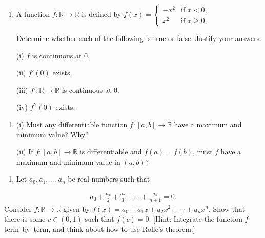 \documentclass[letterpaper,10pt,english]{jupyterBook}
\begin{document}
\label{\detokenize{Problems:id46}}\begin{enumerate}
%
\setcounter{enumi}{45}
\item {} 
\sphinxAtStartPar
A function \(f:\mathbb{R} \rightarrow \mathbb{R}\) is defined by \(f(x) = \begin{cases} -x^{2} & \text{if }x < 0,\\ x^{2} & \text{if }x \geq 0. \end{cases}\)

Determine whether each of the following is true or false. Justify your answers.

\sphinxAtStartPar
(i) \(f\) is continuous at \(0\).

\sphinxAtStartPar
(ii) \(f'(0)\) exists.

\sphinxAtStartPar
(iii) \(f':\mathbb{R}\to\mathbb{R}\) is continuous at \(0\).

\sphinxAtStartPar
(iv) \(f^{\prime \prime}(0)\) exists.

\end{enumerate}
\label{\detokenize{Problems:id47}}\begin{enumerate}
%
\setcounter{enumi}{46}
\item {} 
\sphinxAtStartPar
{}

\sphinxAtStartPar
(i) Must any differentiable function \(f:[a, b] \rightarrow \mathbb{R}\) have a maximum and minimum value? Why?

\sphinxAtStartPar
(ii) If \(f:[a, b] \rightarrow \mathbb{R}\) is differentiable  and \(f(a) = f(b)\), must \(f\) have a maximum and minimum value in \((a, b)\)?

\end{enumerate}
\label{\detokenize{Problems:id48}}\begin{enumerate}
%
\setcounter{enumi}{47}
\item {} 
\sphinxAtStartPar
Let \(a_{0}, a_{1}, \ldots, a_{n}\) be real numbers such that

\end{enumerate}
\begin{equation*}
\begin{split}
a_{0} + \frac{a_{1}}{2} + \frac{a_{2}}{3} + \cdots + \frac{a_{n}}{n+1} = 0.
\end{split}
\end{equation*}
\sphinxAtStartPar
Consider \(f:\mathbb{R}\to\mathbb{R}\) given by \(f(x) = a_{0}+ a_{1}x + a_{2}x^{2} + \cdots + a_{n}x^{n}\). Show that there is some \(c\in (0,1)\) such that \(f(c)=0\). {[}Hint: Integrate the function \(f\) term–by–term, and think about how to use Rolle’s theorem.{]}
\end{document}

